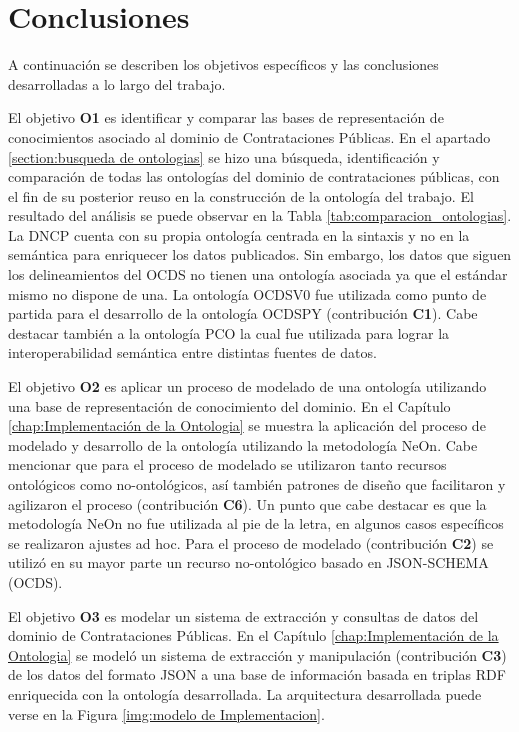 \section{Conclusiones}
\label{chap:analisis}
A continuación se describen los objetivos específicos y las conclusiones desarrolladas a lo largo del trabajo.  

El objetivo \textbf{O1} es identificar y comparar las bases de representación de conocimientos asociado al dominio de Contrataciones Públicas. En el apartado \ref{section:busqueda de ontologias} se hizo una búsqueda, identificación y comparación de todas las ontologías del dominio de contrataciones públicas, con el fin de su posterior reuso en la construcción de la ontología del trabajo. El resultado del análisis se puede observar en la Tabla \ref{tab:comparacion_ontologias}. La DNCP cuenta con su propia ontología centrada en la sintaxis y no en la semántica para enriquecer los datos publicados. Sin embargo, los datos que siguen los delineamientos del OCDS no tienen una ontología asociada ya que el estándar mismo no dispone de una. La ontología OCDSV0 fue utilizada como punto de partida para el desarrollo de la ontología OCDSPY (contribución \textbf{C1}). Cabe destacar también a la ontología PCO la cual fue utilizada para lograr la interoperabilidad semántica entre distintas fuentes de datos.

El objetivo \textbf{O2} es aplicar un proceso de modelado de una ontología utilizando una base de representación de conocimiento del dominio. En el Capítulo \ref{chap:Implementación de la Ontologia} se muestra la aplicación del proceso de modelado y desarrollo de la ontología utilizando la metodología NeOn. Cabe mencionar que para el proceso de modelado se utilizaron tanto recursos ontológicos como no-ontológicos, así también patrones de diseño que facilitaron y agilizaron el proceso (contribución \textbf{C6}). Un punto que cabe destacar es que la metodología NeOn no fue utilizada al pie de la letra, en algunos casos específicos se realizaron ajustes ad hoc. Para el proceso de modelado (contribución \textbf{C2}) se utilizó en su mayor parte un recurso no-ontológico basado en JSON-SCHEMA (OCDS).

El objetivo \textbf{O3} es modelar un sistema de extracción y consultas de datos del dominio de Contrataciones Públicas. En el Capítulo \ref{chap:Implementación de la Ontologia} se modeló un sistema de extracción y manipulación (contribución \textbf{C3}) de los datos del formato JSON a una base de información basada en triplas RDF enriquecida con la ontología desarrollada. La arquitectura desarrollada puede verse en la Figura \ref{img:modelo de Implementacion}.

